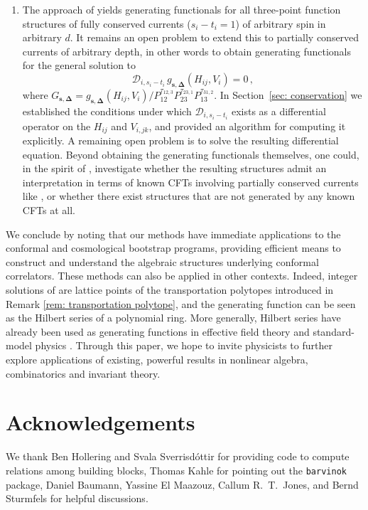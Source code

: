 \documentclass[12pt,a4paper]{extarticle}
\theoremstyle{definition}
\begin{document}
\begin{enumerate}
   \item The approach of \cite{Zhiboedov} yields generating functionals for all three-point function structures of fully conserved currents ($s_i - t_i = 1$) of arbitrary spin in arbitrary $d$. It remains an open problem to extend this to partially conserved currents of arbitrary depth, in other words to obtain generating functionals for the general solution to
%
    \begin{equation}
     \mathcal{D}_{i,s_i-t_i}\, g_{\mathbf{s},\mathbf{\Delta}}(H_{ij}, V_i) = 0\,,
    \end{equation}
%
    where $G_{\mathbf{s},\mathbf{\Delta}} = g_{\mathbf{s},\mathbf{\Delta}}(H_{ij}, V_i) \big/ P^{\tau_{12,3}}_{12}P^{\tau_{23,1}}_{23}P^{\tau_{31,2}}_{13}$. In Section~\ref{sec: conservation} we established the conditions under which $\mathcal{D}_{i,s_i-t_i}$ exists as a differential operator on the $H_{ij}$ and $V_{i,jk}$, and provided an algorithm for computing it explicitly. A remaining open problem is to solve the resulting differential equation. Beyond obtaining the generating functionals themselves, one could, in the spirit of \cite{Zhiboedov}, investigate whether the resulting structures admit an interpretation in terms of known CFTs involving partially conserved currents like \cite{Brust_2017}, or whether there exist structures that are not generated by any known CFTs at all.
\end{enumerate}

\medskip

We conclude by noting that our methods have immediate applications to the conformal and cosmological bootstrap programs, providing efficient means to construct and understand the algebraic structures underlying conformal correlators.
These methods can also be applied in other contexts. Indeed, integer solutions of \cite[Eq.~15]{Heslop2026} are lattice points of the transportation polytopes introduced in Remark \ref{rem: transportation polytope}, and the generating function \cite[Eq.~17]{Heslop2026} can be seen as the Hilbert series of a polynomial ring. More generally, Hilbert series have already been used as generating functions in effective field theory and standard-model physics \cite{HLMM,LM1,LM2,YZ}. Through this paper, we hope to invite physicists to further explore applications of existing, powerful results in nonlinear algebra, combinatorics and invariant theory.

\section*{Acknowledgements}
We thank Ben Hollering and Svala Sverrisdóttir for providing code to compute relations among building blocks, Thomas Kahle for pointing out the \texttt{barvinok} package, Daniel Baumann, Yassine El Maazouz, Callum R.~T.~Jones, and Bernd Sturmfels for helpful discussions.
\smallskip
\end{document}
